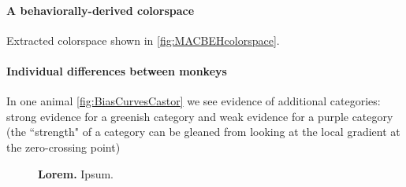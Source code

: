 \paragraph{A behaviorally-derived colorspace}

Extracted colorspace shown in \autoref{fig:MACBEHcolorspace}.

\paragraph{Individual differences between monkeys}

In one animal \autoref{fig:BiasCurvesCastor} we see evidence of additional categories: strong evidence for a greenish category and weak evidence for a purple category (the ``strength" of a category can be gleaned from looking at the local gradient at the zero-crossing point)

\begin{figure}

\caption{\textbf{Lorem.}
Ipsum.
}
\label{fig:IndiDataCogBias}
\end{figure}